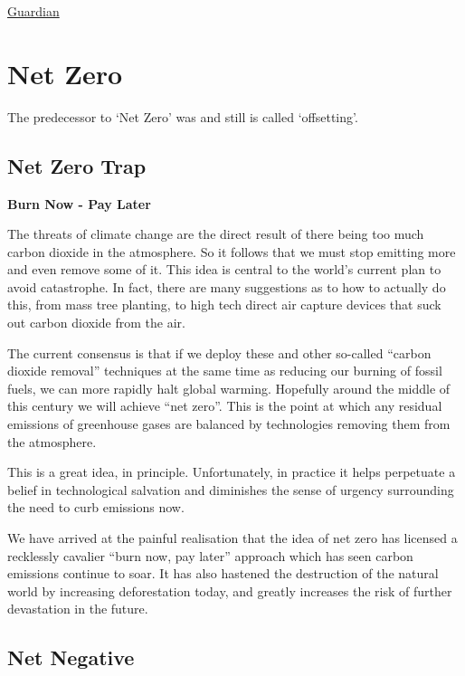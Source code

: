 \documentclass[
]{book}
\begin{document}
\href{https://www.theguardian.com/environment/2021/mar/18/oil-industry-fossil-fuels-air-pollution-documents}{Guardian}

\hypertarget{net-zero-1}{%
\chapter{Net Zero}\label{net-zero-1}}

The predecessor to `Net Zero' was and still is called `offsetting'.

\hypertarget{net-zero-trap}{%
\section{Net Zero Trap}\label{net-zero-trap}}

\textbf{Burn Now - Pay Later}

The threats of climate change are the direct result of there being too much carbon dioxide in the atmosphere. So it follows that we must stop emitting more and even remove some of it. This idea is central to the world's current plan to avoid catastrophe. In fact, there are many suggestions as to how to actually do this, from mass tree planting, to high tech direct air capture devices that suck out carbon dioxide from the air.

The current consensus is that if we deploy these and other so-called ``carbon dioxide removal'' techniques at the same time as reducing our burning of fossil fuels, we can more rapidly halt global warming. Hopefully around the middle of this century we will achieve ``net zero''. This is the point at which any residual emissions of greenhouse gases are balanced by technologies removing them from the atmosphere.

This is a great idea, in principle. Unfortunately, in practice it helps perpetuate a belief in technological salvation and diminishes the sense of urgency surrounding the need to curb emissions now.

We have arrived at the painful realisation that the idea of net zero has licensed a recklessly cavalier ``burn now, pay later'' approach which has seen carbon emissions continue to soar. It has also hastened the destruction of the natural world by increasing deforestation today, and greatly increases the risk of further devastation in the future.

\hypertarget{net-negative}{%
\section{Net Negative}\label{net-negative}}
\end{document}
